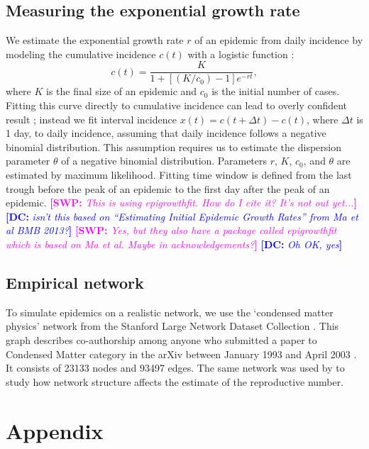 \documentclass[12pt]{article}
\newcommand{\comment}[3]{\textcolor{#1}{\textbf{[#2: }\textsl{#3}\textbf{]}}}
\newcommand{\swp}[1]{\comment{magenta}{SWP}{#1}}
\newcommand{\dc}[1]{\comment{blue}{DC}{#1}}
\begin{document}
\subsection{Measuring the exponential growth rate}

We estimate the exponential growth rate $r$ of an epidemic from daily incidence by modeling the cumulative incidence $c(t)$ with a logistic function \citep{ma2014estimating}: 
\begin{equation}
c(t) = \frac{K}{1 + \left[(K/c_0) - 1\right] e^{-rt}},
\end{equation}
where $K$ is the final size of an epidemic and $c_0$ is the initial number of cases.
Fitting this curve directly to cumulative incidence can lead to overly confident result \citep{king2015avoidable}; instead we fit interval incidence $x(t) = c(t + \Delta t) - c(t)$, where $\Delta t$ is 1 day, to daily incidence, assuming that daily incidence follows a negative binomial distribution. 
This assumption requires us to estimate the dispersion parameter $\theta$ of a negative binomial distribution.
Parameters $r$, $K$, $c_0$, and $\theta$ are estimated by maximum likelihood.
Fitting time window is defined from the last trough before the peak of an epidemic to the first day after the peak of an epidemic.
\swp{This is using epigrowthfit. How do I cite it? It's not out yet...}
\dc{isn't this based on ``Estimating Initial Epidemic Growth Rates'' from Ma et al BMB 2013?}
\swp{Yes, but they also have a package called epigrowthfit which is based on Ma et al. Maybe in acknowledgements?} \dc{Oh OK, yes}

\subsection{Empirical network}

To simulate epidemics on a realistic network, we use the `condensed matter physics' network from the Stanford Large Network Dataset Collection \citep{leskovec2016snap}.
This graph describes co-authorship among anyone who submitted a paper to Condensed Matter category in the arXiv between January 1993 and April 2003 \citep{leskovec2007graph}.
It consists of 23133 nodes and 93497 edges.
The same network was used by \cite{trapman2016inferring} to study how network structure affects the estimate of the reproductive number.

\pagebreak
\appendix
\renewcommand\thefigure{\thesection.\arabic{figure}}
\setcounter{figure}{0}    
\section{Appendix}
\end{document}
